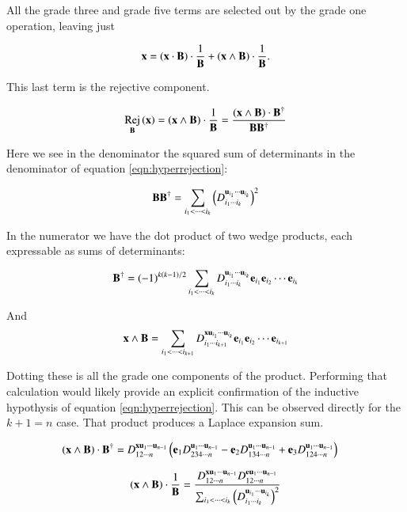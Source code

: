 \documentclass{article}      %
\DeclareMathOperator{\RejName}{Rej}
\newcommand{\Rej}[2]{\RejName_{#1}\left( {#2} \right)}
\begin{document}
All the grade three and grade five terms are selected out by the grade one operation, leaving just

\begin{equation}
\mathbf{x} = (\mathbf{x} \cdot \mathbf{B}) \cdot \frac{1}{\mathbf{B}} + (\mathbf{x} \wedge \mathbf{B}) \cdot \frac{1}{\mathbf{B}}.
\end{equation}

This last term is the rejective component.

\begin{equation}\label{eqn:bladerejection}
\Rej{\BB}{\Bx} = 
(\Bx \wedge \BB) \cdot \inv{\BB}
=
\frac{
(\Bx \wedge \BB) \cdot {\BB}^\dagger
}
{
\BB \BB^\dagger
}
\end{equation}

Here we see in the denominator the squared sum of determinants in the denominator of equation \ref{eqn:hyperrejection}:

\[
\mathbf{B} \mathbf{B}^\dagger = 
\sum_{i_1 < \cdots < i_{k} } \left(D_{i_1 \cdots i_{k}}^{\mathbf{u}_{i_1} \cdots \mathbf{u}_{i_{k}}}\right)^2
\]

In the numerator we have the dot product of two wedge products, each expressable as sums of determinants:

\[
\mathbf{B}^\dagger = (-1)^{k(k-1)/2}
\sum_{i_1 < \cdots < i_{k} } 
D_{i_1 \cdots i_{k}}^{\mathbf{u}_{i_1} \cdots \mathbf{u}_{i_{k}}} \mathbf{e}_{i_1} \mathbf{e}_{i_2} \cdots \mathbf{e}_{i_{k}}
\]

And
\[
\mathbf{x} \wedge \mathbf{B} = 
\sum_{i_1 < \cdots < i_{k+1} } 
D_{i_1 \cdots i_{k+1}}^{\mathbf{x} \mathbf{u}_{i_1} \cdots \mathbf{u}_{i_{k}}} \mathbf{e}_{i_1} \mathbf{e}_{i_2} \cdots \mathbf{e}_{i_{k+1}}
\]

Dotting these is all the grade one components of the product.  
Performing that calculation would likely provide an explicit confirmation of the inductive hypothysis of 
equation \ref{eqn:hyperrejection}.  This can be observed directly for the $k+1=n$ case.  That product produces a Laplace
expansion sum.

\begin{align*}
(\mathbf{x} \wedge \mathbf{B}) \cdot \mathbf{B}^\dagger
&=
D_{1 2 \cdots n}^{\mathbf{x} \mathbf{u}_{1} \cdots \mathbf{u}_{n-1}} 
\left(
\mathbf{e}_{1} D_{2 3 4 \cdots n}^{\mathbf{u}_{1} \cdots \mathbf{u}_{n-1}}
-\mathbf{e}_{2} D_{1 3 4 \cdots n}^{\mathbf{u}_{1} \cdots \mathbf{u}_{n-1}}
+\mathbf{e}_{3} D_{1 2 4 \cdots n}^{\mathbf{u}_{1} \cdots \mathbf{u}_{n-1}}
\right)
\end{align*}

\begin{equation}\label{eqn:hyperrejectionganminus}
(\mathbf{x} \wedge \mathbf{B}) \cdot \frac{1}{\mathbf{B}}
=
\frac{
D_{1 2 \cdots n}^{\mathbf{x} \mathbf{u}_{1} \cdots \mathbf{u}_{n-1}} 
D_{1 2 \cdots n}^{\mathbf{e} \mathbf{u}_{1} \cdots \mathbf{u}_{n-1}}
}
{
\sum_{i_1 < \cdots < i_{k} } \left(D_{i_1 \cdots i_{k}}^{\mathbf{u}_{i_1} \cdots \mathbf{u}_{i_{k}}}\right)^2
}
\end{equation}
\end{document}
